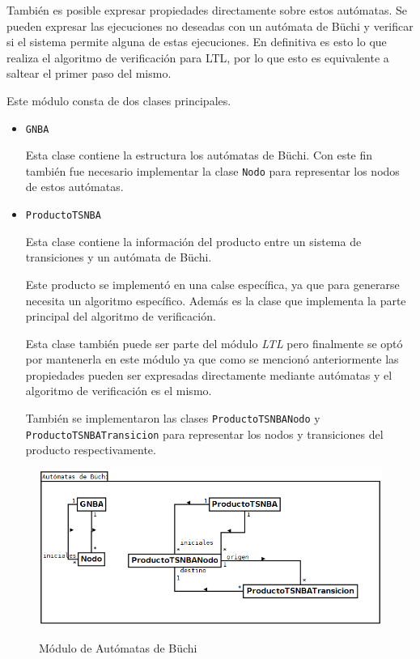 También es posible expresar propiedades directamente sobre estos autómatas.
Se pueden expresar las ejecuciones no deseadas con un autómata de Büchi y verificar
 si el sistema permite alguna de estas ejecuciones.
En definitiva es esto lo que realiza el algoritmo de verificación para LTL, por lo que
 esto es equivalente a saltear el primer paso del mismo.

Este módulo consta de dos clases principales.
\begin{itemize}
\item \texttt{GNBA}

Esta clase contiene la estructura los autómatas de Büchi.
Con este fin también fue necesario implementar la clase \texttt{Nodo} para representar los
 nodos de estos autómatas.

\item \texttt{ProductoTSNBA}

Esta clase contiene la información del producto entre un sistema de transiciones y un
 autómata de Büchi.

Este producto se implementó en una calse específica, ya que para generarse necesita un
 algoritmo específico. Además es la clase que implementa la parte principal del algoritmo
 de verificación.

Esta clase también puede ser parte del módulo \textit{LTL} pero finalmente se optó por
 mantenerla en este módulo ya que como se mencionó anteriormente las propiedades pueden
 ser expresadas directamente mediante autómatas y el algoritmo de verificación es el mismo.

También se implementaron las clases \texttt{ProductoTSNBANodo} y\\
 \texttt{ProductoTSNBATransicion}
 para representar los nodos y transiciones del producto respectivamente.

\end{itemize}

\begin{figure}[hbtp]
\begin{center}
\caption{Módulo de Autómatas de Büchi}
\includegraphics[width=\textwidth]{mc/imagenes/buchi.png}
\label{fig:modulo_buchi}
\end{center}
\end{figure}

